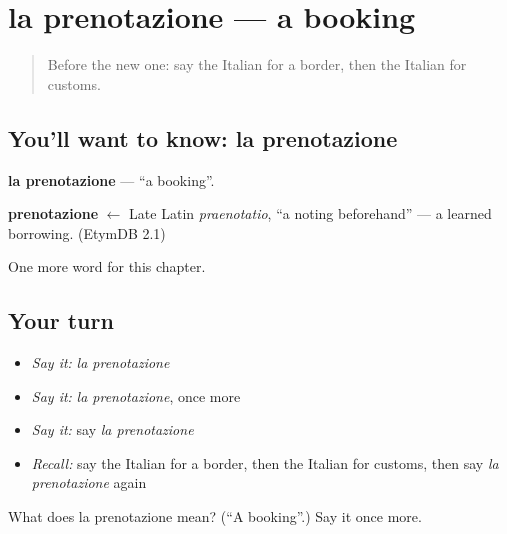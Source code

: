 \section[la prenotazione]{la prenotazione — a booking}

\label{lesson:IT-C192-prenotazione}



\begin{quote}
Before the new one: say the Italian for a border, then the Italian for customs.
\end{quote}

\subsection*{You'll want to know: la prenotazione}
\textbf{la prenotazione} — \textquotedblleft{}a booking\textquotedblright{}.

\begin{cousinweb}
\textbf{prenotazione} $\leftarrow$ Late Latin \emph{praenotatio}, \textquotedblleft{}a noting beforehand\textquotedblright{} — a learned borrowing. (EtymDB 2.1)
\end{cousinweb}

\begin{grammarlens}[title={What you've built}]
One more word for this chapter.
\end{grammarlens}

\subsection*{Your turn}
\begin{itemize}
\raggedright
  \item \emph{Say it:} \emph{la prenotazione}
  \item \emph{Say it:} \emph{la prenotazione}, once more
  \item \emph{Say it:} say \emph{la prenotazione}
  \item \emph{Recall:} say the Italian for a border, then the Italian for customs, then say \emph{la prenotazione} again
\end{itemize}

\begin{tcolorbox}[breakable,colback=teal!4,colframe=teal!35!black,title={Before you move on}]
What does la prenotazione mean? (\textquotedblleft{}A booking\textquotedblright{}.) Say it once more.
\end{tcolorbox}
